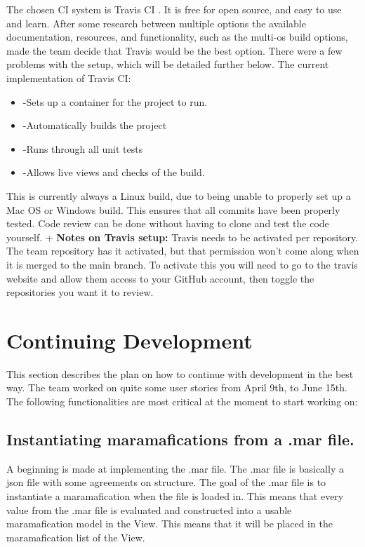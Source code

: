 \documentclass[10pt]{extarticle} %
\begin{document}
    The chosen CI system is Travis CI .
    It is free for open source, and easy to use and learn.
    After some research between multiple options the available documentation, resources, and functionality, such as the multi-os build options, made the team decide that Travis would be the best option.
    There were a few problems with the setup, which will be detailed further below.
    The current implementation of Travis CI:
    \begin{itemize}
         \item-Sets up a container for the project to run.
         \item-Automatically builds the project
         \item-Runs through all unit tests
         \item-Allows live views and checks of the build.
    \end{itemize}
    This is currently always a Linux build, due to being unable to properly set up a Mac OS or Windows build.
    This ensures that all commits have been properly tested.
    Code review can be done without having to clone and test the code yourself.
    +
    \textbf{Notes on Travis setup:}
    Travis needs to be activated per repository.
    The team repository has it activated, but that permission won't come along when it is merged to the main branch.
    To activate this you will need to go to the travis website and allow them access to your GitHub account, then toggle the repositories you want it to review.

    \section{Continuing Development}
    This section describes the plan on how to continue with development in the best way.
    The team worked on quite some user stories from April 9th, to June 15th.
    The following functionalities are most critical at the moment to start working on:
    \subsection{Instantiating maramafications from a .mar file.}
    A beginning is made at implementing the .mar file.
    The .mar file is basically a json file with some agreements on structure.
    The goal of the .mar file is to instantiate a maramafication when the file is loaded in.
    This means that every value from the .mar file is evaluated and constructed into a usable maramafication model in the View.
    This means that it will be placed in the maramafication list of the View.
\end{document}
